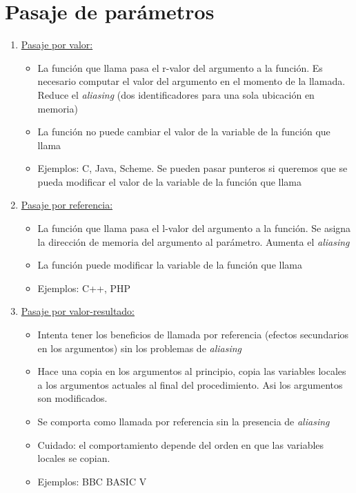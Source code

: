 \documentclass[10pt,a4paper]{report}
\begin{document}
\section{Pasaje de parámetros}
\begin{enumerate}
    \item \underline{Pasaje por valor:} 
    \begin{itemize}
    \item La función que llama pasa el r-valor del argumento a la función. Es 
    necesario computar el valor del argumento en el momento de la llamada. 
    Reduce el \textit{aliasing} (dos identificadores para una sola ubicación en 
    memoria)
    \item  La función no puede cambiar el valor de la variable de la función 
    que llama
    \item Ejemplos: C, Java, Scheme. Se pueden pasar punteros si queremos 
    que se pueda modificar el valor de la variable de la función que llama
    \end{itemize}

    \item \underline{Pasaje por referencia:}
    \begin{itemize}
    \item La función que llama pasa el l-valor del argumento a la función. Se 
    asigna la dirección de memoria del argumento al parámetro. Aumenta el 
    \textit{aliasing}
    \item La función puede modificar la variable de la función que llama
    \item Ejemplos: C++, PHP
    \end{itemize}

    \item \underline{Pasaje por valor-resultado:}
    \begin{itemize}
    \item Intenta tener los beneficios de llamada por referencia (efectos 
    secundarios en los argumentos) sin los problemas de \textit{aliasing}
    \item Hace una copia en los argumentos al principio, copia las variables 
    locales a los argumentos actuales al final del procedimiento. Asi los 
    argumentos son modificados.
    \item Se comporta como llamada por referencia sin la presencia de   
    \textit{aliasing}
    \item Cuidado: el comportamiento depende del orden en que las 
    variables locales se copian.
    \item Ejemplos: BBC BASIC V
    \end{itemize}
    

\end{enumerate}
\end{document}
